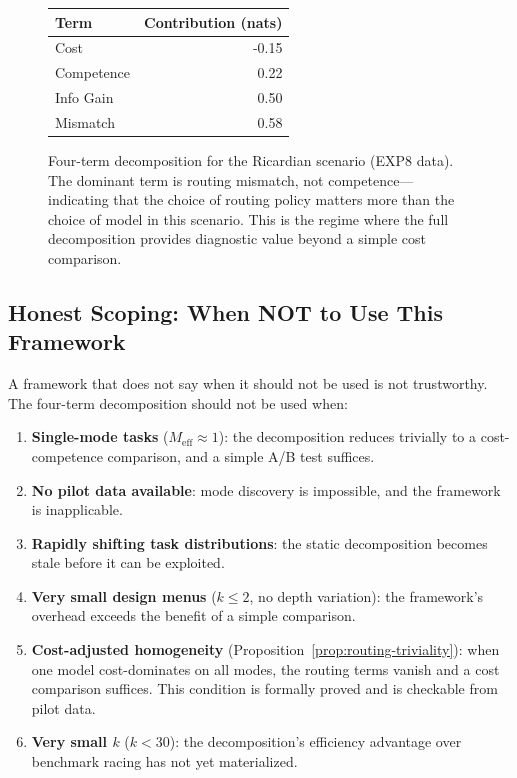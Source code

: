 \documentclass[twoside,11pt]{article}
\newcommand{\Meff}{M_{\mathrm{eff}}}
\begin{document}
\begin{figure}[t]
  \centering
  \begin{tabular}{lr}
    \toprule
    Term & Contribution (nats) \\
    \midrule
    Cost & -0.15 \\
    Competence & 0.22 \\
    Info Gain & 0.50 \\
    Mismatch & 0.58 \\
    \bottomrule
  \end{tabular}
  \caption{Four-term decomposition for the Ricardian scenario (EXP8 data).
  The dominant term is routing mismatch, not competence---indicating that the choice of routing policy matters more than the choice of model in this scenario.
  This is the regime where the full decomposition provides diagnostic value beyond a simple cost comparison.}
  \label{fig:four-term-bar}
\end{figure}

\subsection{Honest Scoping: When NOT to Use This Framework}
\label{sec:scoping}

A framework that does not say when it should not be used is not trustworthy.
The four-term decomposition should not be used when:

\begin{enumerate}
  \item \textbf{Single-mode tasks} ($\Meff \approx 1$): the decomposition reduces trivially to a cost-competence comparison, and a simple A/B test suffices.
  \item \textbf{No pilot data available}: mode discovery is impossible, and the framework is inapplicable.
  \item \textbf{Rapidly shifting task distributions}: the static decomposition becomes stale before it can be exploited.
  \item \textbf{Very small design menus} ($k \le 2$, no depth variation): the framework's overhead exceeds the benefit of a simple comparison.
  \item \textbf{Cost-adjusted homogeneity} (Proposition~\ref{prop:routing-triviality}): when one model cost-dominates on all modes, the routing terms vanish and a cost comparison suffices.
  This condition is formally proved and is checkable from pilot data.
  \item \textbf{Very small $k$} ($k < 30$): the decomposition's efficiency advantage over benchmark racing has not yet materialized.
\end{enumerate}
\end{document}
